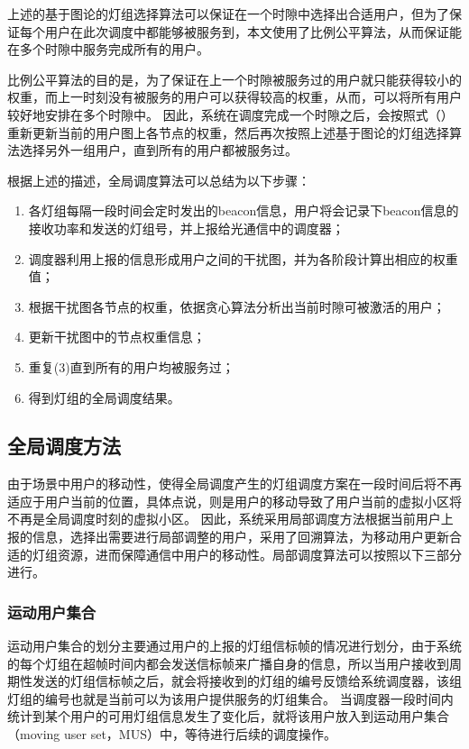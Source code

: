 %
%

上述的基于图论的灯组选择算法可以保证在一个时隙中选择出合适用户，但为了保证每个用户在此次调度中都能够被服务到，本文使用了比例公平算法，从而保证能在多个时隙中服务完成所有的用户。

比例公平算法的目的是，为了保证在上一个时隙被服务过的用户就只能获得较小的权重，而上一时刻没有被服务的用户可以获得较高的权重，从而，可以将所有用户较好地安排在多个时隙中。
因此，系统在调度完成一个时隙之后，会按照式（）重新更新当前的用户图上各节点的权重，然后再次按照上述基于图论的灯组选择算法选择另外一组用户，直到所有的用户都被服务过。

根据上述的描述，全局调度算法可以总结为以下步骤：

\begin{enumerate}
    \item 各灯组每隔一段时间会定时发出的beacon信息，用户将会记录下beacon信息的接收功率和发送的灯组号，并上报给光通信中的调度器；
    \item 调度器利用上报的信息形成用户之间的干扰图，并为各阶段计算出相应的权重值；
    \item 根据干扰图各节点的权重，依据贪心算法分析出当前时隙可被激活的用户；
    \item 更新干扰图中的节点权重信息；
    \item 重复(3)直到所有的用户均被服务过；
    \item 得到灯组的全局调度结果。
\end{enumerate}

\subsection{全局调度方法}
由于场景中用户的移动性，使得全局调度产生的灯组调度方案在一段时间后将不再适应于用户当前的位置，具体点说，则是用户的移动导致了用户当前的虚拟小区将不再是全局调度时刻的虚拟小区。
因此，系统采用局部调度方法根据当前用户上报的信息，选择出需要进行局部调整的用户，采用了回溯算法，为移动用户更新合适的灯组资源，进而保障通信中用户的移动性。局部调度算法可以按照以下三部分进行。

\subsubsection{运动用户集合}
运动用户集合的划分主要通过用户的上报的灯组信标帧的情况进行划分，由于系统的每个灯组在超帧时间内都会发送信标帧来广播自身的信息，所以当用户接收到周期性发送的灯组信标帧之后，就会将接收到的灯组的编号反馈给系统调度器，该组灯组的编号也就是当前可以为该用户提供服务的灯组集合。
当调度器一段时间内统计到某个用户的可用灯组信息发生了变化后，就将该用户放入到运动用户集合（moving user set，MUS）中，等待进行后续的调度操作。

